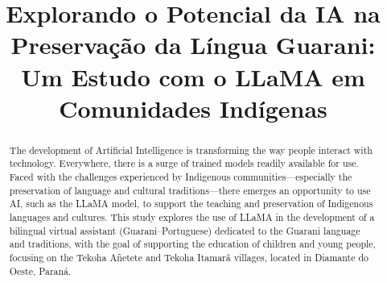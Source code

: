 \documentclass[10pt,conference]{IEEEtran}
\begin{document}
\title{Explorando o Potencial da IA na Preservação da Língua Guarani: Um Estudo com o LLaMA em Comunidades Indígenas}
\newif\iffinal
\finaltrue
\iffinal
\else
  \author{ID do artigo Latin.science 2020: \cmtid \\ }
\fi
\maketitle
\thispagestyle{fancy}

\begin{abstract}
The development of Artificial Intelligence is transforming the way people interact with technology. Everywhere, there is a surge of trained models readily available for use. Faced with the challenges experienced by Indigenous communities—especially the preservation of language and cultural traditions—there emerges an opportunity to use AI, such as the LLaMA model, to support the teaching and preservation of Indigenous languages and cultures. This study explores the use of LLaMA in the development of a bilingual virtual assistant (Guarani–Portuguese) dedicated to the Guarani language and traditions, with the goal of supporting the education of children and young people, focusing on the Tekoha Añetete and Tekoha Itamarã villages, located in Diamante do Oeste, Paraná.
\end{abstract}
\end{document}
